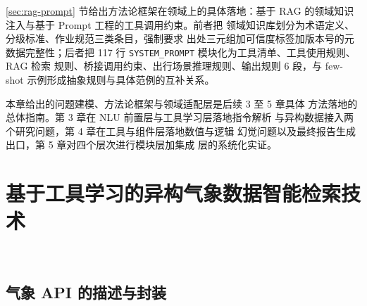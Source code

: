 \documentclass[a4paper]{article}
\newcommand{\song}{\CJKfamily{song}}
\newcommand{\xiaosihao}{\fontsize{12pt}{18pt}\selectfont}
\newcommand{\sectionbreak}{\clearpage} %
\newcommand\seccontent{
	\song
	\xiaosihao %
    \setlength{\parindent}{2em} %
    \setlength{\parskip}{0pt}
    }
\theoremstyle{definition}
\theoremstyle{plain}
\theoremstyle{remark}
\newcommand{\reffig}[1]{图 \ref{#1}}
\newcommand{\reftab}[1]{表 \ref{#1}}
\let\oldcite\cite
\renewcommand{\cite}[1]{\textsuperscript{\oldcite{#1}}}
\newcommand{\bk}{\discretionary{}{}{}}
\begin{document}
\ref{sec:rag-prompt} 节给出方法论框架在领域上的具体落地：基于
RAG 的领域知识注入与基于 Prompt 工程的工具调用约束。前者把
领域知识库划分为术语定义、分级标准、作业规范三类条目，强制要求
出处三元组加可信度标签加版本号的元数据完整性；后者把 117 行
\texttt{SYSTEM\_\bk{}PROMPT} 模块化为工具清单、工具使用规则、RAG 检索
规则、桥接调用约束、出行场景推理规则、输出规则 6 段，与
few-shot 示例形成抽象规则与具体范例的互补关系。

本章给出的问题建模、方法论框架与领域适配层是后续 3 至 5 章具体
方法落地的总体指南。第 3 章在 NLU 前置层与工具学习层落地指令解析
与异构数据接入两个研究问题，第 4 章在工具与组件层落地数值与逻辑
幻觉问题以及最终报告生成出口，第 5 章对四个层次进行模块层加集成
层的系统化实证。




\sectionbreak
\seccontent
\section{基于工具学习的异构气象数据智能检索技术}
\label{chap:retrieval}

﻿%

\subsection{气象 API 的描述与封装}
\label{sec:api-tooling}
\end{document}
